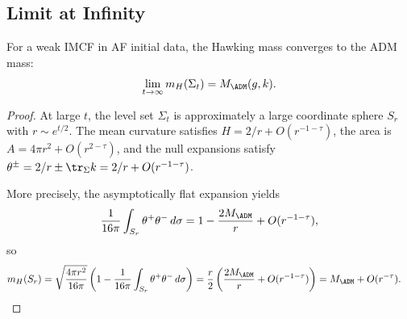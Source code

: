 \subsection{Limit at Infinity}
\begin{proposition}
For a weak IMCF in AF initial data, the Hawking mass converges to the ADM mass:
\begin{equation}
    \lim_{t \to \infty} m_H(\Sigma_t) = M_{\ADM}(g, k).
\end{equation}
\end{proposition}

\begin{proof}
At large $t$, the level set $\Sigma_t$ is approximately a large coordinate sphere $S_r$ with $r \sim e^{t/2}$. The mean curvature satisfies $H = 2/r + O(r^{-1-\tau})$, the area is $A = 4\pi r^2 + O(r^{2-\tau})$, and the null expansions satisfy $\theta^\pm = 2/r \pm \tr_\Sigma k = 2/r + O(r^{-1-\tau})$.

More precisely, the asymptotically flat expansion yields
\begin{equation}
\frac{1}{16\pi}\int_{S_r} \theta^+\theta^-\, d\sigma 
= 1 - \frac{2M_{\ADM}}{r} + O(r^{-1-\tau}),
\end{equation}
so
\begin{align}
m_H(S_r)
&= \sqrt{\frac{4\pi r^2}{16\pi}}\left(1-\frac{1}{16\pi}\int_{S_r}\theta^+\theta^-\,d\sigma\right)
= \frac{r}{2}\left(\frac{2M_{\ADM}}{r}+O(r^{-1-\tau})\right)
= M_{\ADM}+O(r^{-\tau}).
\end{align}
\end{proof}

